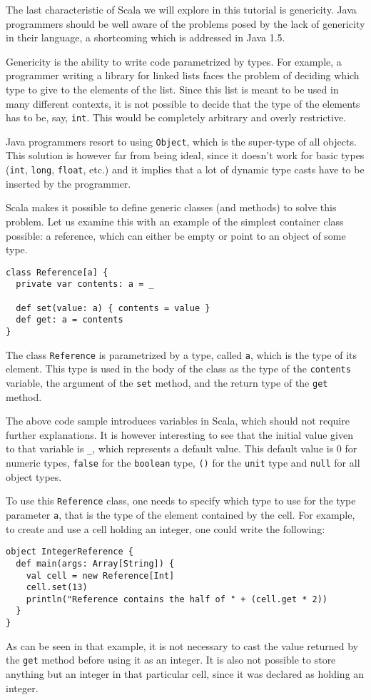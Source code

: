 \documentclass[a4paper,12pt,twoside,titlepage]{article}
\begin{document}
The last characteristic of Scala we will explore in this tutorial is
genericity. Java programmers should be well aware of the problems
posed by the lack of genericity in their language, a shortcoming which
is addressed in Java 1.5.

Genericity is the ability to write code parametrized by types. For
example, a programmer writing a library for linked lists faces the
problem of deciding which type to give to the elements of the list.
Since this list is meant to be used in many different contexts, it is
not possible to decide that the type of the elements has to be, say,
\lstinline?int?. This would be completely arbitrary and overly
restrictive.

Java programmers resort to using \lstinline?Object?, which is the
super-type of all objects. This solution is however far from being
ideal, since it doesn't work for basic types (\lstinline?int?,
\lstinline?long?, \lstinline?float?, etc.) and it implies that a lot of
dynamic type casts have to be inserted by the programmer.

Scala makes it possible to define generic classes (and methods) to
solve this problem. Let us examine this with an example of the
simplest container class possible: a reference, which can either be
empty or point to an object of some type.
\begin{lstlisting}
class Reference[a] {
  private var contents: a = _

  def set(value: a) { contents = value }
  def get: a = contents
}
\end{lstlisting}
The class \lstinline?Reference? is parametrized by a type, called \lstinline?a?,
which is the type of its element. This type is used in the body of the
class as the type of the \lstinline?contents? variable, the argument of
the \lstinline?set? method, and the return type of the \lstinline?get? method.

The above code sample introduces variables in Scala, which should not
require further explanations. It is however interesting to see that
the initial value given to that variable is \lstinline?_?, which represents
a default value. This default value is 0 for numeric types,
\lstinline?false? for the \lstinline?boolean? type, \lstinline?()? for the \lstinline?unit?
type and \lstinline?null? for all object types.

To use this \lstinline?Reference? class, one needs to specify which type to use
for the type parameter \lstinline?a?, that is the type of the element
contained by the cell. For example, to create and use a cell holding
an integer, one could write the following:
\begin{lstlisting}
object IntegerReference {
  def main(args: Array[String]) {
    val cell = new Reference[Int]
    cell.set(13)
    println("Reference contains the half of " + (cell.get * 2))
  }
}
\end{lstlisting}
As can be seen in that example, it is not necessary to cast the value
returned by the \lstinline?get? method before using it as an integer. It
is also not possible to store anything but an integer in that
particular cell, since it was declared as holding an integer.
\end{document}
